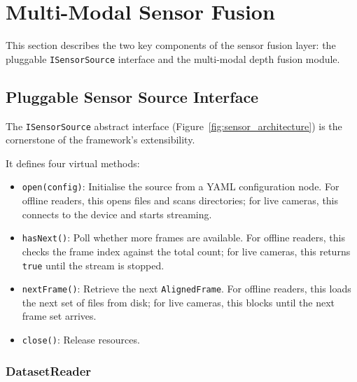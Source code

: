 \section{Multi-Modal Sensor Fusion}
\label{sec:sensor_fusion}

This section describes the two key components of the sensor fusion layer:
the pluggable \texttt{ISensorSource} interface and the multi-modal depth
fusion module.

\subsection{Pluggable Sensor Source Interface}
\label{subsec:sensor_interface}

The \texttt{ISensorSource} abstract interface (Figure~\ref{fig:sensor_architecture})
is the cornerstone of the framework's extensibility.



It defines four virtual methods:

\begin{itemize}
    \item \texttt{open(config)}: Initialise the source from a YAML
    configuration node. For offline readers, this opens files and scans
    directories; for live cameras, this connects to the device and starts
    streaming.

    \item \texttt{hasNext()}: Poll whether more frames are available.
    For offline readers, this checks the frame index against the total
    count; for live cameras, this returns \texttt{true} until the stream
    is stopped.

    \item \texttt{nextFrame()}: Retrieve the next \texttt{AlignedFrame}.
    For offline readers, this loads the next set of files from disk;
    for live cameras, this blocks until the next frame set arrives.

    \item \texttt{close()}: Release resources.
\end{itemize}

\subsubsection{DatasetReader}

